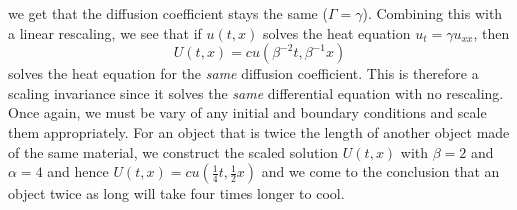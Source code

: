 \documentclass{article}
\numberwithin{equation}{section}
\begin{document}
we get that the diffusion coefficient stays the same ($\Gamma =\gamma$). Combining this with a linear rescaling, we see that if $u(t,x)$ solves the heat equation $u_t = \gamma u_{xx}$, then 
\begin{equation}
    U(t,x) = cu(\beta^{-2}t, \beta^{-1}x)
\end{equation}
solves the heat equation for the \textit{same} diffusion coefficient. This is therefore a scaling invariance since it solves the \textit{same} differential equation with no rescaling. Once again, we must be vary of any initial and boundary conditions and scale them appropriately. For an object that is twice the length of another object made of the same material, we construct the scaled solution $U(t,x)$ with $\beta = 2$ and $\alpha =4$ and hence $U(t,x) = cu(\frac{1}{4}t, \frac{1}{2}x)$ and we come to the conclusion that an object twice as long will take four times longer to cool. 
\end{document}
